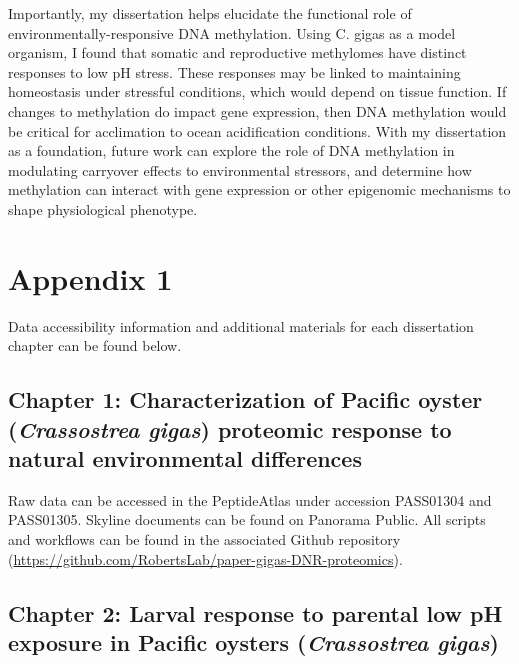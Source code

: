 \documentclass [11pt, proquest] {uwthesis}[2015/03/03]
\begin{document}
Importantly, my dissertation helps elucidate the functional role of environmentally-responsive DNA methylation. Using C. gigas as a model organism, I found that somatic and reproductive methylomes have distinct responses to low pH stress. These responses may be linked to maintaining homeostasis under stressful conditions, which would depend on tissue function. If changes to methylation do impact gene expression, then DNA methylation would be critical for acclimation to ocean acidification conditions. With my dissertation as a foundation, future work can explore the role of DNA methylation in modulating carryover effects to environmental stressors, and determine how methylation can interact with gene expression or other epigenomic mechanisms to shape physiological phenotype.

\appendix

\hypertarget{appendix-1}{%
\chapter{Appendix 1}\label{appendix-1}}

Data accessibility information and additional materials for each dissertation chapter can be found below.

\hypertarget{chapter-1-characterization-of-pacific-oyster-crassostrea-gigas-proteomic-response-to-natural-environmental-differences}{%
\section{\texorpdfstring{Chapter 1: Characterization of Pacific oyster (\emph{Crassostrea gigas}) proteomic response to natural environmental differences}{Chapter 1: Characterization of Pacific oyster (Crassostrea gigas) proteomic response to natural environmental differences}}\label{chapter-1-characterization-of-pacific-oyster-crassostrea-gigas-proteomic-response-to-natural-environmental-differences}}

Raw data can be accessed in the PeptideAtlas under accession PASS01304 and PASS01305. Skyline documents can be found on Panorama Public. All scripts and workflows can be found in the associated Github repository (\url{https://github.com/RobertsLab/paper-gigas-DNR-proteomics}).

\hypertarget{chapter-2-larval-response-to-parental-low-ph-exposure-in-pacific-oysters-crassostrea-gigas}{%
\section{\texorpdfstring{Chapter 2: Larval response to parental low pH exposure in Pacific oysters (\emph{Crassostrea gigas})}{Chapter 2: Larval response to parental low pH exposure in Pacific oysters (Crassostrea gigas)}}\label{chapter-2-larval-response-to-parental-low-ph-exposure-in-pacific-oysters-crassostrea-gigas}}
\end{document}
